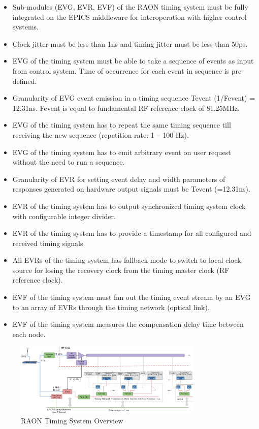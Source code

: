 \documentclass[journal,reqno]{IEEEtran}
\begin{document}
\begin{itemize}
	\item Sub-modules (EVG, EVR, EVF) of the RAON timing system must be fully integrated on the EPICS middleware for interoperation with higher control systems.
	\item Clock jitter must be less than 1ns and timing jitter must be less than 50ps.
	\item EVG of the timing system must be able to take a sequence of events as input from control system. Time of occurrence for each event in sequence is pre-defined.
	\item Granularity of EVG event emission in a timing sequence Tevent (1/Fevent) = 12.31ns. Fevent is equal to fundamental RF reference clock of 81.25MHz.
	\item EVG of the timing system has to repeat the same timing sequence till receiving the new sequence (repetition rate: 1 – 100 Hz).
	\item EVG of the timing system has to emit arbitrary event on user request without the need to run a sequence.
	\item Granularity of EVR for setting event delay and width parameters of responses generated on hardware output signals must be Tevent (=12.31ns). 
	\item EVR of the timing system has to output synchronized timing system clock with configurable integer divider.
	\item EVR of the timing system has to provide a timestamp for all configured and received timing signals.
	\item All EVRs of the timing system has fallback mode to switch to local clock source for losing the recovery clock from the timing master clock (RF reference clock).
	\item EVF of the timing system must fan out the timing event stream by an EVG to an array of EVRs through the timing network (optical link).
	\item EVF of the timing system measures the compensation delay time between each node.
\end{itemize}

\begin{figure}[!htb]
	\centering
	\includegraphics*[width=0.8\textwidth, height=0.45\textwidth]{img25.png}
	\caption{RAON Timing System Overview}
	\label{timing_overview}
\end{figure}
\end{document}
